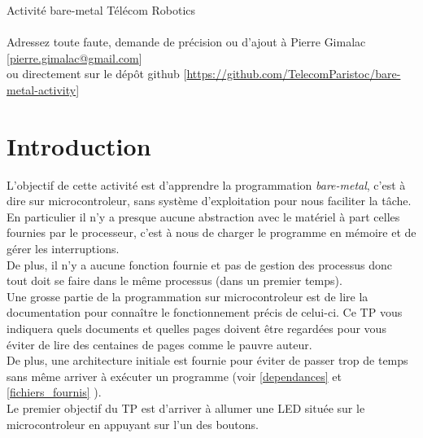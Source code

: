 \documentclass[a4paper,10pt]{article} %
\begin{document}
\LARGE
Activité bare-metal \hfill Télécom Robotics\\\\
\small Adressez toute faute, demande de précision ou d'ajout à Pierre Gimalac [\href{mailto:pierre.gimalac@gmail.com}{pierre.gimalac@gmail.com}]\\
ou directement sur le dépôt github [\href{https://github.com/TelecomParistoc/bare-metal-activity}{https://github.com/TelecomParistoc/bare-metal-activity}]

\normalsize
\renewcommand{\contentsname}{Sommaire}
\thispagestyle{empty}
\tableofcontents
\thispagestyle{empty}

\newpage

\section{Introduction}
L'objectif de cette activité est d'apprendre la programmation \textit{bare-metal}, c'est à dire sur microcontroleur, sans système d'exploitation pour nous faciliter la tâche.\\

En particulier il n'y a presque aucune abstraction avec le matériel à part celles fournies par le processeur, c'est à nous de charger le programme en mémoire et de gérer les interruptions.\\

De plus, il n'y a aucune fonction fournie et pas de gestion des processus donc tout doit se faire dans le même processus (dans un premier temps).\\

Une grosse partie de la programmation sur microcontroleur est de lire la documentation pour connaître le fonctionnement précis de celui-ci. Ce TP vous indiquera quels documents et quelles pages doivent être regardées pour vous éviter de lire des centaines de pages comme le pauvre auteur.\\

De plus, une architecture initiale est fournie pour éviter de passer trop de temps sans même arriver à exécuter un programme (voir \autoref{dependances}  et \autoref{fichiers_fournis} ).\\

Le premier objectif du TP est d'arriver à allumer une LED située sur le microcontroleur en appuyant sur l'un des boutons.
\end{document}
